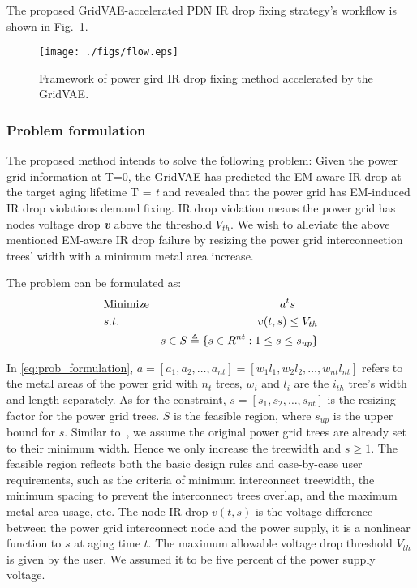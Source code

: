 The proposed GridVAE-accelerated PDN IR drop fixing strategy's workflow is shown in Fig.~\ref{fig:flow}. 


\begin{figure}[h!]
	\centering
	\texttt{[image: ./figs/flow.eps]}
	\caption{Framework of power gird IR drop fixing method accelerated by the GridVAE.}
	\label{fig:flow}
\end{figure}

\subsubsection{Problem formulation}
\label{subsubsec:formulation}
The proposed method intends to solve the following problem: 
Given the power grid information at T=0, the GridVAE has predicted the EM-aware IR drop at the target aging lifetime T = \textit{t} and revealed that the power grid has EM-induced IR drop violations demand fixing. IR drop violation means the power grid  has nodes voltage drop \textit{\textbf{v}} above the threshold $V_{th}$.
We wish to alleviate the above mentioned EM-aware IR drop failure by resizing the power grid interconnection trees' width with a minimum metal area increase.

The problem can be formulated as:
\begin{align}
	\label{eq:prob_formulation}
	&\mbox{Minimize}  & a^{t}s \qquad   \notag  \\
	&s.t.     & v(t,s)\leq V_{th} \\
	& \quad   &s \in S   \triangleq \{ s \in R^{nt}: 1 \leq s \leq s_{up} \}        \notag
\end{align}

In \eqref{eq:prob_formulation}, $a=[a_{1},a_{2},\ldots,a_{nt}] = [w_{1}l_{1},w_{2}l_{2},\ldots,w_{nt}l_{nt}]$ refers to the metal areas of the power grid with $n_{t}$ trees, $w_{i}$ and $l_{i}$ are the $i_{th}$ tree's width and length separately.
As for the constraint, $s=[s_{1},s_{2},\ldots,s_{nt}]$  is the resizing factor for the power grid trees. $S$ is the feasible region, where $s_{up}$ is the upper bound for $s$. Similar to~\cite{Sukharev:2019pg}, we assume the original power grid trees are already set to their minimum width. Hence we only increase the treewidth and $s \geq 1 $.
The feasible region reflects both the basic design rules and case-by-case user requirements, such as the criteria of minimum interconnect treewidth, the minimum spacing to prevent the interconnect trees overlap, and the maximum metal area usage, etc. 
The node IR drop $v(t,s)$ is the voltage difference between the power grid interconnect node and the power supply, it is a nonlinear function to $s$ at aging time $t$. The maximum allowable voltage drop threshold $V_{th}$ is given by the user. We assumed it to be five percent of the power supply voltage.


